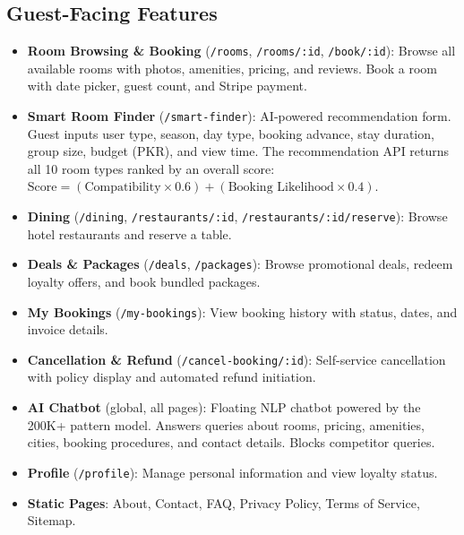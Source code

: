 \documentclass[12pt,a4paper]{report}
\begin{document}
\subsection*{Guest-Facing Features}
\begin{itemize}[leftmargin=*, label=\textbullet]
  \item \textbf{Room Browsing \& Booking} (\texttt{/rooms}, \texttt{/rooms/:id}, \texttt{/book/:id}): Browse all available rooms with photos, amenities, pricing, and reviews. Book a room with date picker, guest count, and Stripe payment.
  \item \textbf{Smart Room Finder} (\texttt{/smart-finder}): AI-powered recommendation form. Guest inputs user type, season, day type, booking advance, stay duration, group size, budget (PKR), and view time. The recommendation API returns all 10 room types ranked by an overall score: $\text{Score} = (\text{Compatibility} \times 0.6) + (\text{Booking Likelihood} \times 0.4)$.
  \item \textbf{Dining} (\texttt{/dining}, \texttt{/restaurants/:id}, \texttt{/restaurants/:id/reserve}): Browse hotel restaurants and reserve a table.
  \item \textbf{Deals \& Packages} (\texttt{/deals}, \texttt{/packages}): Browse promotional deals, redeem loyalty offers, and book bundled packages.
  \item \textbf{My Bookings} (\texttt{/my-bookings}): View booking history with status, dates, and invoice details.
  \item \textbf{Cancellation \& Refund} (\texttt{/cancel-booking/:id}): Self-service cancellation with policy display and automated refund initiation.
  \item \textbf{AI Chatbot} (global, all pages): Floating NLP chatbot powered by the 200K+ pattern model. Answers queries about rooms, pricing, amenities, cities, booking procedures, and contact details. Blocks competitor queries.
  \item \textbf{Profile} (\texttt{/profile}): Manage personal information and view loyalty status.
  \item \textbf{Static Pages}: About, Contact, FAQ, Privacy Policy, Terms of Service, Sitemap.
\end{itemize}
\end{document}
